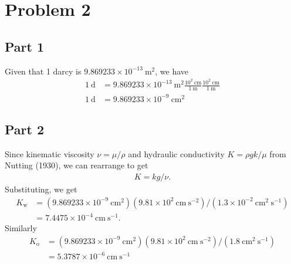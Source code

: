 \documentclass{article}
\begin{document}
\section{Problem 2}
\subsection{Part 1}
Given that 1 darcy is $9.869233 \times 10^{-13} \mathrm{\ m}^2$, we have
\begin{align}
    1 \mathrm{\ d} &= 9.869233 \times 10^{-13} \mathrm{\ m}^2 \frac{10^2 \mathrm{\ cm}}{1 \mathrm{\ m}} \frac{10^2 \mathrm{\ cm}}{1 \mathrm{\ m}} \\
    1 \mathrm{\ d} &= 9.869233 \times 10^{-9} \mathrm{\ cm}^2
\end{align}

\subsection{Part 2}
Since kinematic viscosity $\nu = \mu / \rho$ and hydraulic conductivity $K = \rho g k / \mu$ from Nutting (1930), we can rearrange to get
\begin{align}
    K = kg/\nu.
\end{align}
Substituting, we get 
\begin{align}
    K_{\mathrm{w}} &= (9.869233 \times 10^{-9} \mathrm{\ cm}^2)(9.81 \times 10^2 \mathrm{\ cm} \mathrm{\ s}^{-2}) / (1.3 \times 10^{-2} \mathrm{\ cm}^2 \mathrm{\ s}^{-1}) \\
    &= 7.4475 \times 10^{-4} \mathrm{\ cm} \mathrm{\ s}^{-1}.
\end{align}
Similarly
\begin{align}
    K_{\mathrm{o}} &= (9.869233 \times 10^{-9} \mathrm{\ cm}^2)(9.81 \times 10^2 \mathrm{\ cm} \mathrm{\ s}^{-2}) / (1.8 \mathrm{\ cm}^2 \mathrm{\ s}^{-1}) \\
    &= 5.3787 \times 10^{-6} \mathrm{\ cm} \mathrm{\ s}^{-1}
\end{align}
%
%
%
\end{document}
